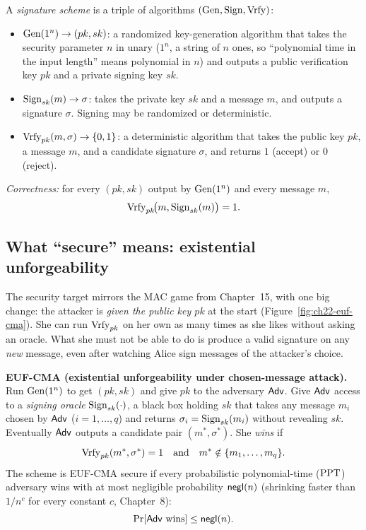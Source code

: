\begin{definition}
\label{ch22:def-scheme}
A \emph{signature scheme} is a triple of algorithms $(\operatorname{Gen}, \operatorname{Sign}, \operatorname{Vrfy})$:
\begin{itemize}
  \item $\operatorname{Gen}(1^n) \to (pk, sk)$: a randomized key-generation algorithm that takes the security parameter $n$ in unary ($1^n$, a string of $n$ ones, so ``polynomial time in the input length'' means polynomial in $n$) and outputs a public verification key $pk$ and a private signing key $sk$.
  \item $\operatorname{Sign}_{sk}(m) \to \sigma$: takes the private key $sk$ and a message $m$, and outputs a signature $\sigma$. Signing may be randomized or deterministic.
  \item $\operatorname{Vrfy}_{pk}(m, \sigma) \to \{0,1\}$: a deterministic algorithm that takes the public key $pk$, a message $m$, and a candidate signature $\sigma$, and returns $1$ (accept) or $0$ (reject).
\end{itemize}
\emph{Correctness:} for every $(pk, sk)$ output by $\operatorname{Gen}(1^n)$ and every message $m$,
\[
  \operatorname{Vrfy}_{pk}\!\bigl(m, \operatorname{Sign}_{sk}(m)\bigr) = 1.
\]
\end{definition}

\subsection{What ``secure'' means: existential unforgeability}
\label{ch22:euf-cma}

The security target mirrors the MAC game from Chapter~15, with one big change: the attacker is \emph{given the public key $pk$} at the start (Figure~\ref{fig:ch22-euf-cma}). She can run $\operatorname{Vrfy}_{pk}$ on her own as many times as she likes without asking an oracle. What she must not be able to do is produce a valid signature on any \emph{new} message, even after watching Alice sign messages of the attacker's choice.

\begin{formalbox}
\textbf{EUF-CMA (existential unforgeability under chosen-message attack).} Run $\operatorname{Gen}(1^n)$ to get $(pk, sk)$ and give $pk$ to the adversary $\mathsf{Adv}$. Give $\mathsf{Adv}$ access to a \emph{signing oracle} $\operatorname{Sign}_{sk}(\cdot)$, a black box holding $sk$ that takes any message $m_i$ chosen by $\mathsf{Adv}$ ($i = 1, \dots, q$) and returns $\sigma_i = \operatorname{Sign}_{sk}(m_i)$ without revealing $sk$. Eventually $\mathsf{Adv}$ outputs a candidate pair $(m^*, \sigma^*)$. She \emph{wins} if
\[
  \operatorname{Vrfy}_{pk}(m^*, \sigma^*) = 1 \quad\text{and}\quad m^* \notin \{m_1, \dots, m_q\}.
\]
The scheme is EUF-CMA secure if every probabilistic polynomial-time ($\mathrm{PPT}$) adversary wins with at most negligible probability $\mathsf{negl}(n)$ (shrinking faster than $1/n^c$ for every constant $c$, Chapter~8):
\[
  \Pr[\mathsf{Adv} \text{ wins}] \le \mathsf{negl}(n).
\]
\end{formalbox}

